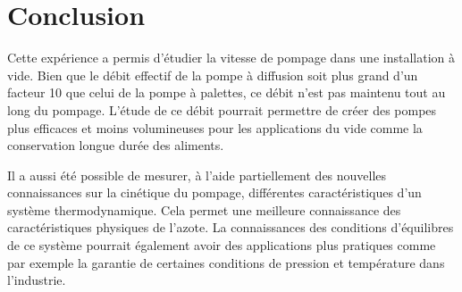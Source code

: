 \section{Conclusion}

Cette expérience a permis d'étudier la vitesse de pompage dans une installation à vide. Bien que le débit effectif de la pompe à diffusion soit plus grand d'un facteur 10 que celui de la pompe à palettes, ce débit n'est pas maintenu tout au long du pompage. L'étude de ce débit pourrait permettre de créer des pompes plus efficaces et moins volumineuses pour les applications du vide comme la conservation longue durée des aliments.

Il a aussi été possible de mesurer, à l'aide partiellement des nouvelles connaissances sur la cinétique du pompage, différentes caractéristiques d'un système thermodynamique. Cela permet une meilleure connaissance des caractéristiques physiques de l'azote. La connaissances des conditions d'équilibres de ce système pourrait également avoir des applications plus pratiques comme par exemple la garantie de certaines conditions de pression et température dans l'industrie.